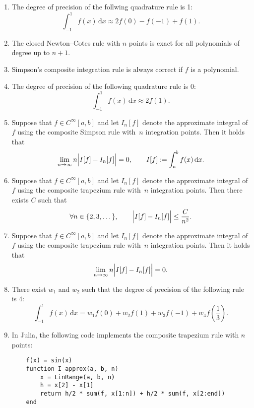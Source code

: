 \documentclass{article}
\renewcommand{\d}{\mathrm d}
\begin{document}
\begin{enumerate}

    \item
        The degree of precision of the follwing quadrature rule is 1:
        \[
            \int_{-1}^{1} f(x) \, \d x
            \approx 2 f(0) - f(-1) + f(1).
        \]

    \item
        The closed Newton--Cotes rule with $n$ points is exact for all polynomials of degree up to $n+1$.

    \item
        Simpson's composite integration rule is always correct if $f$ is a polynomial.

    \item
        The degree of precision of the following quadrature rule is 0:
        \[
            \int_{-1}^1 f(x) \, \d x \approx 2f(1).
        \]

    \item
        Suppose that $f \in C^{\infty}[a, b]$ and let $I_n[f]$ denote the approximate integral of $f$ using the composite Simpson rule
        with~$n$ integration points.
        Then it holds that
        \[
            \lim_{n \to \infty} n \Bigl\lvert I[f] - I_n[f] \Bigr\rvert = 0, \qquad I[f] := \int_{a}^{b} f(x) \, \d x.
        \]

    \item
        Suppose that $f \in C^{\infty}[a, b]$ and let $I_n[f]$ denote the approximate integral of $f$ using the composite trapezium rule
        with~$n$ integration points.
        Then there exists $C$ such that
        \[
             \forall n \in \{2, 3, \dotsc \}, \qquad
             \Bigl\lvert I[f] - I_n[f] \Bigr\rvert \leq \frac{C}{n^2}.
        \]

    \item
        Suppose that $f \in C^{\infty}[a, b]$ and let $I_n[f]$ denote the approximate integral of $f$ using the composite trapezium rule
        with~$n$ integration points.
        Then it holds that
        \[
             \lim_{n \to \infty} n \Bigl\lvert I[f] - I_n[f] \Bigr\rvert = 0.
        \]

    \item
        There exist $w_1$ and $w_2$ such that the degree of precision of the following rule is $4$:
        \[
            \int_{-1}^1 f(x) \, \d x
            = w_1 f(0) + w_2 f(1) + w_3 f(-1) + w_4 f \left( \frac{1}{3} \right).
        \]

    \item
        In Julia, the following code implements the composite trapezium rule with $n$ points:
        \begin{verbatim}
    f(x) = sin(x)
    function I_approx(a, b, n)
        x = LinRange(a, b, n)
        h = x[2] - x[1]
        return h/2 * sum(f, x[1:n]) + h/2 * sum(f, x[2:end])
    end
        \end{verbatim}


\end{enumerate}
\end{document}
